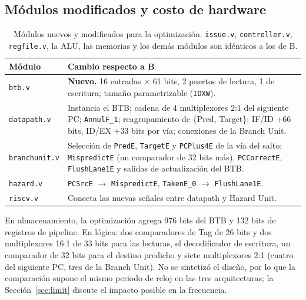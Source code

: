 \documentclass[12pt,a4paper]{article}
\newcommand{\sig}[1]{\texttt{#1}}
\begin{document}
\noindent\begin{minipage}{\linewidth}

\end{minipage}

\subsection{Módulos modificados y costo de hardware}

\begin{table}[H]
\centering
\small
\begin{tabularx}{\linewidth}{lX}
\toprule
\textbf{Módulo} & \textbf{Cambio respecto a B} \\
\midrule
\texttt{btb.v} & \textbf{Nuevo.} 16 entradas $\times$ 61 bits, 2 puertos de lectura, 1 de escritura; tamaño parametrizable (\texttt{IDXW}). \\
\texttt{datapath.v} & Instancia el BTB; cadena de 4 multiplexores 2:1 del siguiente PC; \sig{AnnulF\_1}; reagrupamiento de \{Pred, Target\}; IF/ID +66 bits, ID/EX +33 bits por vía; conexiones de la Branch Unit. \\
\texttt{branchunit.v} & Selección de \sig{PredE}, \sig{TargetE} y \sig{PCPlus4E} de la vía del salto; \sig{MispredictE} (un comparador de 32 bits más), \sig{PCCorrectE}, \sig{FlushLane1E} y salidas de actualización del BTB. \\
\texttt{hazard.v} & \sig{PCSrcE} $\to$ \sig{MispredictE}, \sig{TakenE\_0} $\to$ \sig{FlushLane1E}. \\
\texttt{riscv.v} & Conecta las nuevas señales entre datapath y Hazard Unit. \\
\bottomrule
\end{tabularx}
\caption{Módulos nuevos y modificados para la optimización. \texttt{issue.v}, \texttt{controller.v}, \texttt{regfile.v}, la ALU, las memorias y los demás módulos son idénticos a los de B.}
\label{tab:modulos}
\end{table}

En almacenamiento, la optimización agrega 976 bits del BTB y 132 bits de registros de pipeline. En lógica: dos comparadores de Tag de 26 bits y dos multiplexores 16:1 de 33 bits para las lecturas, el decodificador de escritura, un comparador de 32 bits para el destino predicho y siete multiplexores 2:1 (cuatro del siguiente PC, tres de la Branch Unit). No se sintetizó el diseño, por lo que la comparación supone el mismo periodo de reloj en las tres arquitecturas; la Sección~\ref{sec:limit} discute el impacto posible en la frecuencia.
\end{document}
